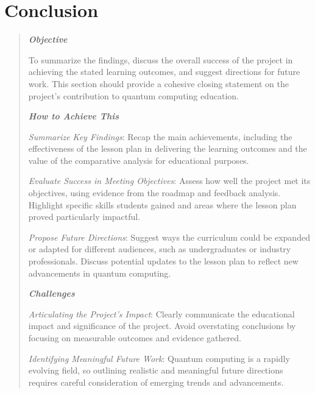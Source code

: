 \section{Conclusion}

\begin{quote}\itshape
\textbf{\emph{Objective}}

To summarize the findings, discuss the overall success of the project in achieving the stated learning outcomes, 
and suggest directions for future work. This section should provide a cohesive closing statement on the project’s contribution to quantum computing education.

\textbf{\emph{How to Achieve This}}

\emph{Summarize Key Findings}: Recap the main achievements, including the effectiveness of the lesson plan in delivering 
the learning outcomes and the value of the comparative analysis for educational purposes.

\emph{Evaluate Success in Meeting Objectives}: Assess how well the project met its objectives, using evidence from 
the roadmap and feedback analysis. Highlight specific skills students gained and areas where the lesson plan proved particularly impactful.

\emph{Propose Future Directions}: Suggest ways the curriculum could be expanded or adapted for different audiences, such as 
undergraduates or industry professionals. Discuss potential updates to the lesson plan to reflect new advancements in quantum computing.

\textbf{\emph{Challenges}}

\emph{Articulating the Project’s Impact}: Clearly communicate the educational impact and significance of the project. 
Avoid overstating conclusions by focusing on measurable outcomes and evidence gathered.

\emph{Identifying Meaningful Future Work}: Quantum computing is a rapidly evolving field, so outlining realistic 
and meaningful future directions requires careful consideration of emerging trends and advancements.
\end{quote}\ignorespacesafterend
    
